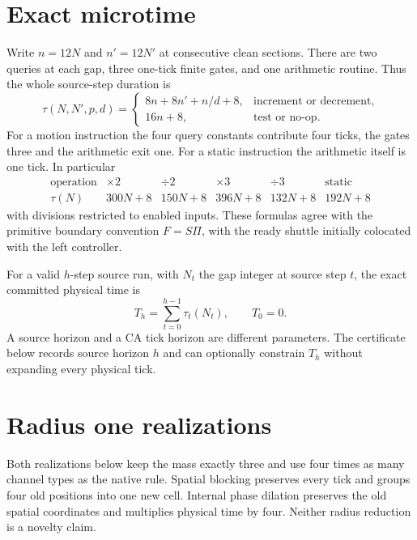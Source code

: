 \documentclass[11pt,letterpaper]{article}
\numberwithin{equation}{section}
\theoremstyle{definition}
\theoremstyle{remark}
\begin{document}
\section{Exact microtime}\label{smc:tm:sec:timing}

Write $n=12N$ and $n'=12N'$ at consecutive clean sections. There are two queries at each gap, three one-tick finite gates, and one arithmetic routine. Thus the whole source-step duration is
\begin{equation}\label{smc:tm:eq:timing}
\tau(N,N',p,d)=
\begin{cases}
8n+8n'+n/d+8,&\text{increment or decrement},\\
16n+8,&\text{test or no-op}.
\end{cases}
\end{equation}
For a motion instruction the four query constants contribute four ticks, the gates three and the arithmetic exit one. For a static instruction the arithmetic itself is one tick. In particular
\[
\begin{array}{c|ccccc}
\text{operation}&\times2&\div2&\times3&\div3&\text{static}\\\hline
\tau(N)&300N+8&150N+8&396N+8&132N+8&192N+8
\end{array}
\]
with divisions restricted to enabled inputs. These formulas agree with the primitive boundary convention $F=S\Pi$, with the ready shuttle initially colocated with the left controller.

For a valid $h$-step source run, with $N_t$ the gap integer at source step $t$, the exact committed physical time is
\begin{equation}\label{smc:tm:eq:totaltime}
T_h=\sum_{t=0}^{h-1}\tau_t(N_t),\qquad T_0=0.
\end{equation}
A source horizon and a CA tick horizon are different parameters. The certificate below records source horizon $h$ and can optionally constrain $T_h$ without expanding every physical tick.

\section{Radius one realizations}\label{smc:tm:sec:radius-one}

Both realizations below keep the mass exactly three and use four times
as many channel types as the native rule. Spatial blocking preserves
every tick and groups four old positions into one new cell. Internal
phase dilation preserves the old spatial coordinates and multiplies
physical time by four. Neither radius reduction is a novelty claim.
\end{document}
